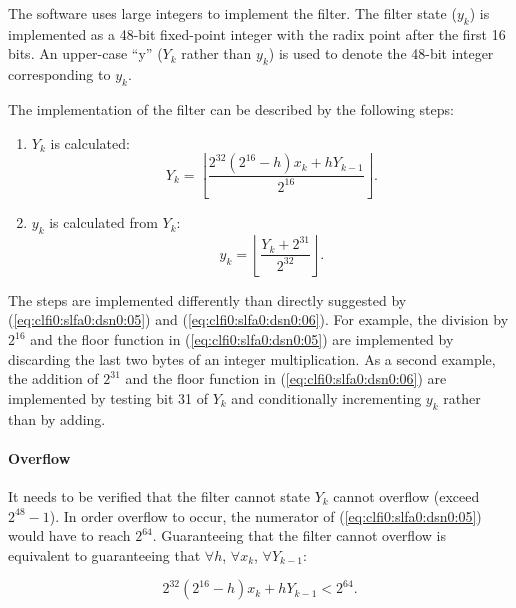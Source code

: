 The software uses large integers to implement the filter.  The filter state
($y_k$) is implemented as a 48-bit fixed-point integer with the radix point after the first 
16 bits.  An upper-case ``y'' ($Y_k$ rather than $y_k$) is used to denote the 
48-bit integer corresponding to $y_k$.

The implementation of the filter can be described by the following steps:

\begin{enumerate}
\item $Y_k$ is calculated:
      \begin{equation}
      \label{eq:clfi0:slfa0:dsn0:05}
      Y_k = \left\lfloor \frac{2^{32}(2^{16}-h)x_k + h Y_{k-1}}{2^{16}} \right\rfloor .
      \end{equation}
\item $y_k$ is calculated from $Y_k$:
      \begin{equation}
      \label{eq:clfi0:slfa0:dsn0:06}
      y_k = \left\lfloor \frac{Y_k + 2^{31}}{2^{32}} \right\rfloor .
      \end{equation}
\end{enumerate}

The steps are implemented differently than directly suggested by
(\ref{eq:clfi0:slfa0:dsn0:05}) and (\ref{eq:clfi0:slfa0:dsn0:06}).  For example, 
the division by $2^{16}$ and the floor function
in (\ref{eq:clfi0:slfa0:dsn0:05}) are implemented by discarding the last two bytes of
an integer multiplication.  As a second example, the 
addition of $2^{31}$ and the floor function in (\ref{eq:clfi0:slfa0:dsn0:06}) are implemented
by testing bit 31 of $Y_k$ and conditionally incrementing $y_k$ rather than by adding.


\paragraph{Overflow}

It needs to be verified that the filter cannot state $Y_k$ cannot overflow
(exceed $2^{48}-1$).
In order overflow to occur, the numerator of
(\ref{eq:clfi0:slfa0:dsn0:05}) would have to reach $2^{64}$\@.  Guaranteeing that the
filter cannot overflow is equivalent to guaranteeing that $\forall h$,
$\forall x_k$, $\forall Y_{k-1}$:

\begin{equation}
\label{eq:clfi0:slfa0:dsn0:10}
2^{32}(2^{16}-h)x_k + h Y_{k-1} < 2^{64} .
\end{equation}

